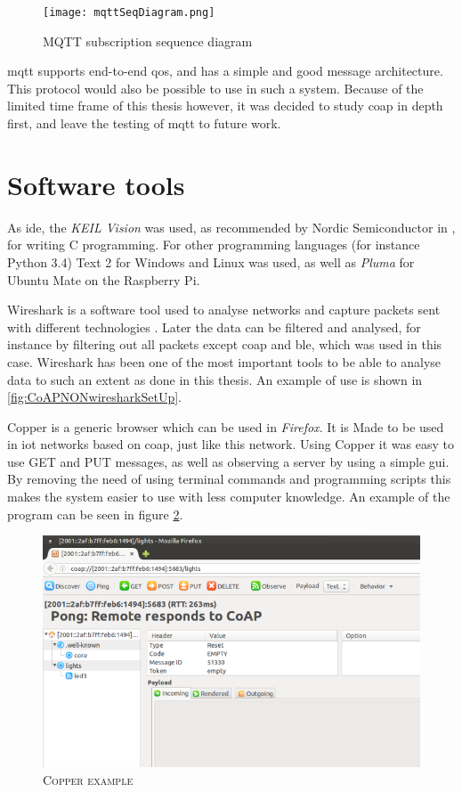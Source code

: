 \begin{figure}[ht]
    \centering
    \texttt{[image: mqttSeqDiagram.png]}    
    \caption{MQTT subscription sequence diagram}
    \label{fig:mqttSeqDiagram}
\end{figure}

\gls{mqtt} supports end-to-end \gls{qos}, and has a simple and good message architecture. This protocol would also be possible to use in such a system. Because of the limited time frame of this thesis however, it was decided to study \gls{coap} in depth first, and leave the testing of \gls{mqtt} to future work. 



\section{Software tools}

As \gls{ide}, the \textit{KEIL Vision} was used, as recommended by Nordic Semiconductor in \cite{nordicSoftwareTools}, for writing C programming. For other programming languages (for instance Python 3.4)  Text 2 for Windows and Linux was used, as well as \textit{Pluma} for Ubuntu Mate on the Raspberry Pi. 

Wireshark is a software tool used to analyse networks and capture packets sent with different technologies \cite{lamping2004wireshark}. Later the data can be filtered and analysed, for instance by filtering out all packets except \gls{coap} and \gls{ble}, which was used in this case. Wireshark has been one of the most important tools to be able to analyse data to such an extent as done in this thesis. An example of use is shown in \ref{fig:CoAPNONwiresharkSetUp}. 

Copper is a generic browser which can be used in \textit{Firefox}. It is Made to be used in \gls{iot} networks based on \gls{coap}, just like this network. Using Copper it was easy to use GET and PUT messages, as well as observing a server by using a simple \gls{gui}. By removing the need of using terminal commands and programming scripts this makes the system easier to use with less computer knowledge. An example of the program can be seen in figure \ref{fig:copperExample}. 
\cite{kovatsch2011demo}

\begin{figure}[ht]
    \centering
    \includegraphics[width=1.0\textwidth]{CopperExample.png}    
    \caption{\textsc{Copper example}}
    \label{fig:copperExample}
\end{figure}

